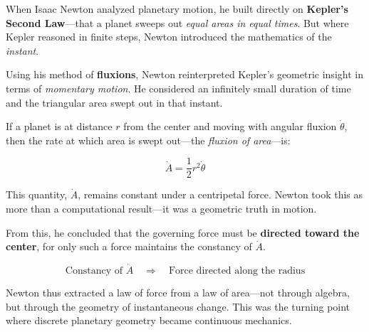 \begin{tcolorbox}[colback=gray!5!white, colframe=black, title=\textbf{Historical Sidebar: Newton’s Fluxions and the Geometry of Instantaneous Motion}, fonttitle=\bfseries, arc=1.5mm, boxrule=0.4pt]

  When Isaac Newton analyzed planetary motion, he built directly on \textbf{Kepler’s Second Law}—that a planet sweeps out \textit{equal areas in equal times}. But where Kepler reasoned in finite steps, Newton introduced the mathematics of the \textit{instant}.
  
  Using his method of \textbf{fluxions}, Newton reinterpreted Kepler’s geometric insight in terms of \textit{momentary motion}. He considered an infinitely small duration of time and the triangular area swept out in that instant.
  
  \vspace{0.5em}
  If a planet is at distance \( r \) from the center and moving with angular fluxion \( \dot{\theta} \), then the rate at which area is swept out—the \textit{fluxion of area}—is:
  
  \[
  \dot{A} = \frac{1}{2} r^2 \dot{\theta}
  \]
  
  This quantity, \( \dot{A} \), remains constant under a centripetal force. Newton took this as more than a computational result—it was a geometric truth in motion.
  
  \vspace{0.5em}
  From this, he concluded that the governing force must be \textbf{directed toward the center}, for only such a force maintains the constancy of \( \dot{A} \).
  
  \[
  \text{Constancy of } \dot{A} \quad \Rightarrow \quad \text{Force directed along the radius}
  \]
  
  Newton thus extracted a law of force from a law of area—not through algebra, but through the geometry of instantaneous change. This was the turning point where discrete planetary geometry became continuous mechanics.
  
\end{tcolorbox}
  